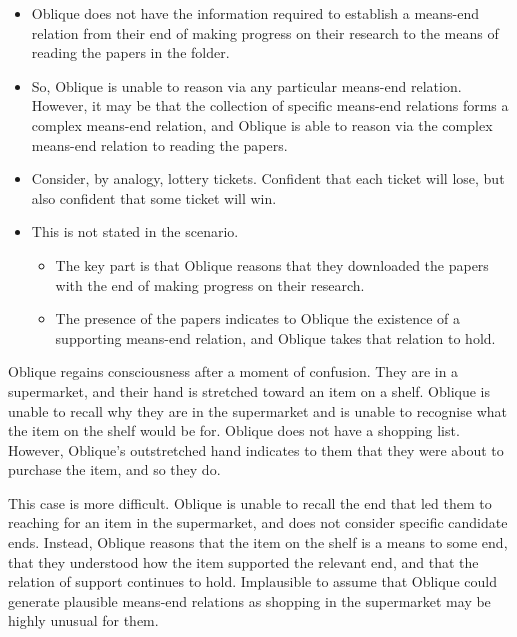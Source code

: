 \documentclass[10pt]{article}
\newcommand{\hozlinedash}[0]{%
  \noindent\hdashrule[0.5ex][c]{\textwidth}{.1pt}{2.5pt}
}
\begin{document}
\begin{itemize}
\item Oblique does not have the information required to establish a means-end relation from their end of making progress on their research to the means of reading the papers in the folder.
\item So, Oblique is unable to reason via any particular means-end relation. However, it may be that the collection of specific means-end relations forms a complex means-end relation, and Oblique is able to reason via the complex means-end relation to reading the papers.
\item Consider, by analogy, lottery tickets.
  Confident that each ticket will lose, but also confident that some ticket will win.
\item This is not stated in the scenario.
  \begin{itemize}
  \item The key part is that Oblique reasons that they downloaded the papers with the end of making progress on their research.
  \item The presence of the papers indicates to Oblique the existence of a supporting means-end relation, and Oblique takes that relation to hold.
  \end{itemize}
\end{itemize}

\hozlinedash

\begin{scenario}[Supermarket]
  Oblique regains consciousness after a moment of confusion.
  They are in a supermarket, and their hand is stretched toward an item on a shelf.
  Oblique is unable to recall why they are in the supermarket and is unable to recognise what the item on the shelf would be for.
  Oblique does not have a shopping list.
  However, Oblique's outstretched hand indicates to them that they were about to purchase the item, and so they do.
\end{scenario}

This case is more difficult.
Oblique is unable to recall the end that led them to reaching for an item in the supermarket, and does not consider specific candidate ends.
Instead, Oblique reasons that the item on the shelf is a means to some end, that they understood how the item supported the relevant end, and that the relation of support continues to hold.
Implausible to assume that Oblique could generate plausible means-end relations as shopping in the supermarket may be highly unusual for them.
\end{document}
